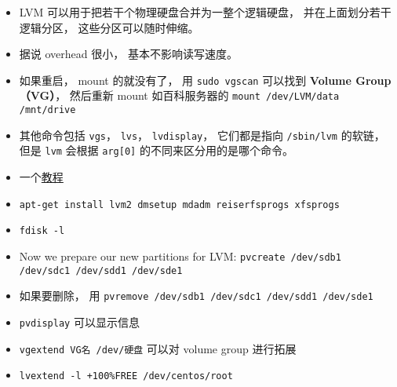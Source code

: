
\begin{issues}
\issueDraft
\end{issues}


\begin{itemize}
\item LVM 可以用于把若干个物理硬盘合并为一整个逻辑硬盘， 并在上面划分若干逻辑分区， 这些分区可以随时伸缩。
\item 据说 overhead 很小， 基本不影响读写速度。
\item 如果重启， mount 的就没有了， 用 \verb`sudo vgscan` 可以找到 \textbf{Volume Group（VG）}， 然后重新 mount 如百科服务器的 \verb`mount /dev/LVM/data /mnt/drive`
\item 其他命令包括 \verb`vgs`， \verb`lvs`， \verb`lvdisplay`， 它们都是指向 \verb`/sbin/lvm` 的软链， 但是 \verb`lvm` 会根据 \verb`arg[0]` 的不同来区分用的是哪个命令。
\end{itemize}

\begin{itemize}
\item 一个\href{https://www.howtoforge.com/linux_lvm}{教程}
\item \verb`apt-get install lvm2 dmsetup mdadm reiserfsprogs xfsprogs`
\item \verb`fdisk -l`
\item Now we prepare our new partitions for LVM: \verb`pvcreate /dev/sdb1 /dev/sdc1 /dev/sdd1 /dev/sde1`
\item 如果要删除， 用 \verb`pvremove /dev/sdb1 /dev/sdc1 /dev/sdd1 /dev/sde1`
\item \verb`pvdisplay` 可以显示信息
\item \verb`vgextend VG名 /dev/硬盘` 可以对 volume group 进行拓展
\item \verb`lvextend -l +100%FREE /dev/centos/root`
\end{itemize}
